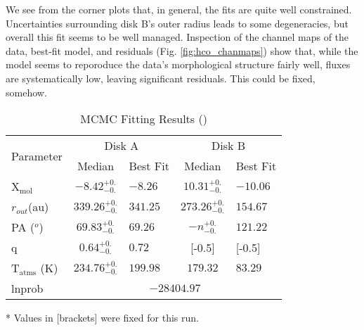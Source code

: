 We see from the corner plots that, in general, the fits are quite well constrained. Uncertainties surrounding disk B's outer radius leads to some degeneracies, but overall this fit seems to be well managed. Inspection of the channel maps of the \hco data, best-fit model, and residuals (Fig. \ref{fig:hco_chanmaps}) show that, while the model seems to reporoduce the data's morphological structure fairly well, fluxes are systematically low, leaving significant residuals. This could be fixed, somehow.

\begin{table}[h!]
  \centering
  \begin{threeparttable}
    \caption{MCMC Fitting Results (\hco)}
    \label{table:fit_hco}
    \renewcommand{\arraystretch}{1.2}
    \begin{tabular}{l c l c l }
      \toprule \toprule
      \multirow{2}{*}{Parameter} & \multicolumn{2}{c}{Disk A} & \multicolumn{2}{c}{Disk B} \\
                                 & Median & Best Fit          & Median & Best Fit \\
      \midrule %
      X$_\text{mol}$            & $ -8.42_{-0.} ^{+0.}$ & $-8.26$    & $ 10.31_{-0.} ^{+0.}$ & $-10.06$ \\
      $r_{out}$(au)        & $ 339.26_{-0.} ^{+0.}$ & $341.25$    & $ 273.26_{-0.} ^{+0.}$  & $154.67$    \\
      PA  ($^o$)        & $ 69.83_{-0.} ^{+0.}$ & $69.26$  & $ -n _{-0.} ^{+0.}$  & $121.22$  \\
      q                         & $ 0.64_{-0.} ^{+0.}$ & $0.72$     & [-0.5]  & [-0.5]  \\
      T$_\text{atms}$ (K) & $ 234.76_{-0.} ^{+0.}$ & $199.98 $  & $179.32$  & $83.29$  \\
      lnprob                    & \multicolumn{4}{c}{$-28404.97$} \\
      \bottomrule
    \end{tabular}
    \begin{tablenotes}\footnotesize
      \item[*] Values in [brackets] were fixed for this run.
    \end{tablenotes}
  \end{threeparttable}
\end{table}








